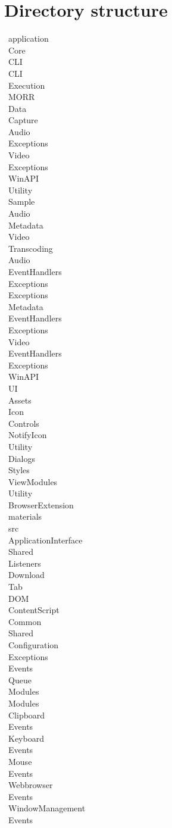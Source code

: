 \chapter{Directory structure}
\label{ch:dirstructure}
\newcommand{\tab}[1][1cm]{\hspace*{#1}}
\newcommand{\dir}[2]{\tab[#1cm] \textbullet \ #2 \\}

\begin{multicols}{2}
\dir{0}{application}
    \dir{0.5}{Core}
        \dir{1}{CLI}
            \dir{1.5}{CLI}
                \dir{2}{Execution}
        \dir{1}{MORR}
            \dir{1.5}{Data}
                \dir{2}{Capture}
                    \dir{2.5}{Audio}
                        \dir{3}{Exceptions}
                    \dir{2.5}{Video}
                        \dir{3}{Exceptions}
                            \dir{3.5}{WinAPI}
                                \dir{4}{Utility}
                \dir{2}{Sample}
                    \dir{2.5}{Audio}
                    \dir{2.5}{Metadata}
                    \dir{2.5}{Video}
                \dir{2}{Transcoding}
                    \dir{2.5}{Audio}
                        \dir{3}{EventHandlers}
                        \dir{3}{Exceptions}
                    \dir{2.5}{Exceptions}
                    \dir{2.5}{Metadata}
                        \dir{3}{EventHandlers}
                        \dir{3}{Exceptions}
                    \dir{2.5}{Video}
                        \dir{3}{EventHandlers}
                        \dir{3}{Exceptions}
                    \dir{2.5}{WinAPI}
        \dir{1}{UI}
            \dir{1.5}{Assets}
                \dir{2}{Icon}
            \dir{1.5}{Controls}
                \dir{2}{NotifyIcon}
                \dir{2}{Utility}
            \dir{1.5}{Dialogs}
            \dir{1.5}{Styles}
            \dir{1.5}{ViewModules}
                \dir{2}{Utility}
    \dir{0.5}{BrowserExtension}
        \dir{1}{materials}
        \dir{1}{src}
            \dir{1.5}{ApplicationInterface}
            \dir{1.5}{Shared}
            \dir{1.5}{Listeners}
                \dir{2}{Download}
                \dir{2}{Tab}
                \dir{2}{DOM}
                    \dir{2.5}{ContentScript}
    \dir{0.5}{Common}
        \dir{1}{Shared}
            \dir{1.5}{Configuration}
                \dir{2}{Exceptions}
            \dir{1.5}{Events}
                \dir{2}{Queue}
            \dir{1.5}{Modules}
    \dir{0.5}{Modules}
        \dir{1}{Clipboard}
            \dir{1.5}{Events}
        \dir{1}{Keyboard}
            \dir{1.5}{Events}
        \dir{1}{Mouse}
            \dir{1.5}{Events}
        \dir{1}{Webbrowser}
            \dir{1.5}{Events}
        \dir{1}{WindowManagement}
            \dir{1.5}{Events}
\end{multicols}